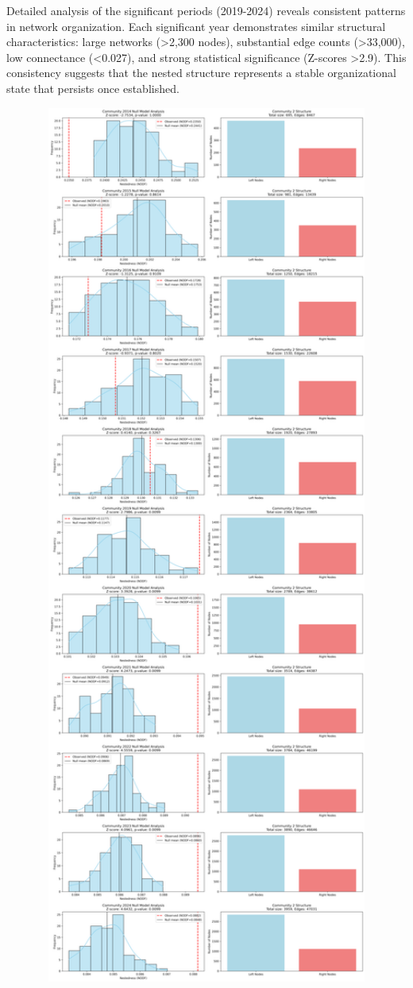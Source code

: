 Detailed analysis of the significant periods (2019-2024) reveals consistent patterns in network organization. Each significant year demonstrates similar structural characteristics: large networks (>2,300 nodes), substantial edge counts (>33,000), low connectance (<0.027), and strong statistical significance (Z-scores >2.9). This consistency suggests that the nested structure represents a stable organizational state that persists once established.

\begin{figure}[htbp]
\centering
\includegraphics[width=1\textwidth]{../figures/us/significant_periods_community_2.png}

\end{figure}

